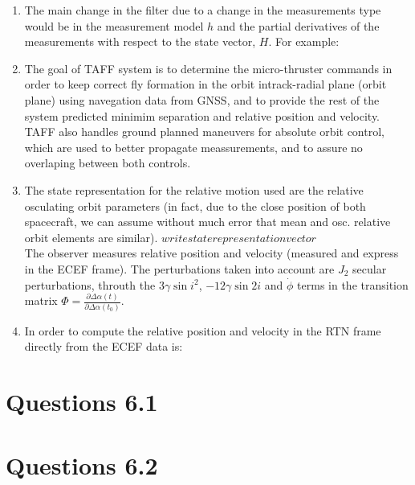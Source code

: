 \documentclass[a4paper]{article}
\begin{document}
\begin{enumerate}[label=\emph{\alph*)}]
  \item The main change in the filter due to a change in the measurements type would be in the measurement model $h$ and the partial derivatives of the measurements with respect to the state vector, $H$. For example:
    
  \item The goal of TAFF system is to determine the micro-thruster commands in order to keep correct fly formation in the orbit intrack-radial plane (orbit plane) using navegation data from GNSS, and to provide the rest of the system predicted minimim separation and relative position and velocity. TAFF also handles ground planned maneuvers for absolute orbit control, which are used to better propagate meassurements, and to assure no overlaping between both controls.
  \item The state representation for the relative motion used are the relative osculating orbit parameters (in fact, due to the close position of both spacecraft, we can assume without much error that mean and osc. relative orbit elements are similar).
    $write state representation vector$\\
    The observer measures relative position and velocity (measured and express in the ECEF frame). The perturbations taken into account are $J_2$ secular perturbations, throuth the $3\gamma\sin{i}^2$, $-12\gamma \sin{2i}$ and $\dot{\phi}$ terms in the transition matrix $\Phi=\frac{\partial \Delta \alpha (t)}{\partial \Delta \alpha (t_0)}$.

  \item In order to compute the relative position and velocity in the RTN frame directly from the ECEF data is:
\end{enumerate}

\section{Questions 6.1}

\section{Questions 6.2}
\end{document}
